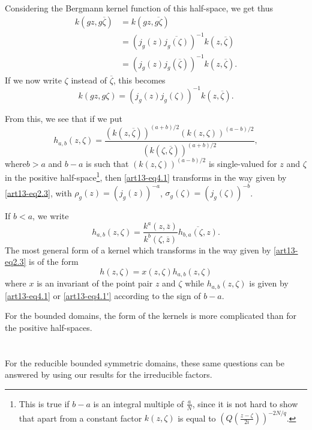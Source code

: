 Considering the Bergmann kernel function of this half-space, we get thus
\begin{align*}
k(gz,g\overline{\zeta}) &= k(gz,\overline{g\zeta})\\
&= (j_{g}(z)\overline{j_{g}(\zeta)})^{-1}k(z,\overline{\zeta})\\
&= (j_{g}(z)j_{g}(\overline{\zeta}))^{-1}k(z,\overline{\zeta}).
\end{align*}
If we now write $\zeta$ instead of $\overline{\zeta}$, this becomes
$$
k(gz,g\zeta)=(j_{g}(z)j_{g}(\zeta))^{-1}k(z,\overline{\zeta}).
$$

From this, we see that if we put
\setcounter{equation}{0}
\begin{equation}
h_{a,b}(z,\zeta)=\dfrac{(k(z,\overline{\zeta}))^{(a+b)/2}(k(z,\zeta))^{(a-b)/2}}{(k(\zeta,\overline{\zeta}))^{(a+b)/2}},\label{art13-eq4.1}
\end{equation}
where\pageoriginale $b>a$ and $b-a$ is such that $(k(z,\zeta))^{(a-b)/2}$ is single-valued for $z$ and $\zeta$ in the positive half-space\footnote[12]{This is true if $b-a$ is an integral multiple of $\frac{a}{N}$, since it is not hard to show that apart from a constant factor $k(z,\zeta)$ is equal to $(Q(\frac{z-\zeta}{2i}))^{-2N/q}$.}, then \eqref{art13-eq4.1} transforms in the way given by \eqref{art13-eq2.3}, with $\rho_{g}(z)=(j_{g}(z))^{-a}$, $\sigma_{g}(\zeta)=(j_{g}(\zeta))^{-b}$.

If $b<a$, we write
\begin{equation*}
h_{a,b}(z,\zeta)=\frac{k^{a}(z,\overline{z})}{k^{b}(\zeta,\overline{z})}\overline{h_{b,a}(\zeta,z)}.\tag{4.1$'$}\label{art13-eq4.1'}
\end{equation*}
The most general form of a kernel which transforms in the way given by \eqref{art13-eq2.3} is of the form
\begin{equation}
h(z,\zeta)=x(z,\zeta)h_{a,b}(z,\zeta)\label{art13-eq4.2}
\end{equation}
where $x$ is an invariant of the point pair $z$ and $\zeta$ while $h_{a,b}(z,\zeta)$ is given by \eqref{art13-eq4.1} or \eqref{art13-eq4.1'} according to the sign of $b-a$.

For the bounded domains, the form of the kernels is more complicated than for the positive half-spaces.

\section{}\label{art13-sec5}
For the reducible bounded symmetric domains, these same questions can be answered by using our results for the irreducible factors.

